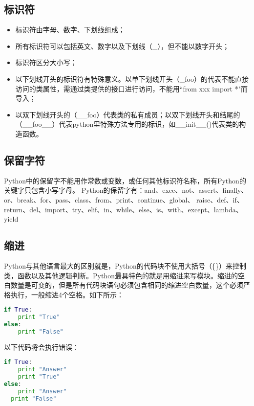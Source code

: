 \subsection{标识符}
\begin{itemize}
\item 标识符由字母、数字、下划线组成；

\item 所有标识符可以包括英文、数字以及下划线（\_），但不能以数字开头；

\item 标识符区分大小写；

\item 以下划线开头的标识符有特殊意义。以单下划线开头（\_foo）的代表不能直接访问的类属性，需通过类提供的接口进行访问，不能用``from xxx import *"而导入；

\item 以双下划线开头的（\_\_foo）代表类的私有成员；以双下划线开头和结尾的（\_\_foo\_\_）代表python里特殊方法专用的标识，如\_\_init\_\_()代表类的构造函数。
\end{itemize}



\subsection{保留字符}
Python中的保留字不能用作常数或变数，或任何其他标识符名称，所有Python的关键字只包含小写字母。
Python的保留字有：and、exec、not、assert、finally、or、break、for、pass、class、from、print、continue、global、
raise、def、if、return、del、import、try、elif、in、while、else、is、with、except、lambda、	yield




\subsection{缩进}
Python与其他语言最大的区别就是，Python的代码块不使用大括号（\{\}）来控制类，函数以及其他逻辑判断。Python最具特色的就是用缩进来写模块。缩进的空白数量是可变的，但是所有代码块语句必须包含相同的缩进空白数量，这个必须严格执行，一般缩进4个空格。如下所示：
\begin{lstlisting}[language=Python]
if True:
    print "True"
else:
    print "False"
\end{lstlisting}
以下代码将会执行错误：
\begin{lstlisting}[language=Python]
     if True:
    print "Answer"
    print "True"
else:
    print "Answer"
  print "False"
\end{lstlisting}



